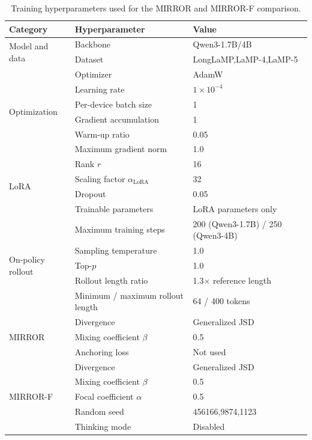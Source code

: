 \documentclass{article} %
\begin{document}
\begin{table}[t]
\centering
\small
\caption{Training hyperparameters used for the MIRROR and MIRROR-F comparison.}
\label{tab:training_hyperparameters}
\begin{tabular}{lll}
\toprule
\textbf{Category} & \textbf{Hyperparameter} & \textbf{Value} \\
\midrule
\multirow{2}{*}{Model and data}
& Backbone & Qwen3-1.7B/4B \\
& Dataset & LongLaMP,LaMP-4,LaMP-5 \\
\midrule
\multirow{6}{*}{Optimization}
& Optimizer & AdamW \\
& Learning rate & $1\times 10^{-4}$ \\
& Per-device batch size & 1 \\
& Gradient accumulation & 1 \\
& Warm-up ratio & 0.05 \\
& Maximum gradient norm & 1.0 \\
\midrule
\multirow{4}{*}{LoRA}
& Rank $r$ & 16 \\
& Scaling factor $\alpha_{\mathrm{LoRA}}$ & 32 \\
& Dropout & 0.05 \\
& Trainable parameters & LoRA parameters only \\
\midrule
\multirow{5}{*}{On-policy rollout}
& Maximum training steps & 200 (Qwen3-1.7B) / 250 (Qwen3-4B) \\
& Sampling temperature & 1.0 \\
& Top-$p$ & 1.0 \\
& Rollout length ratio & 1.3$\times$ reference length \\
& Minimum / maximum rollout length & 64 / 400 tokens \\
\midrule
\multirow{3}{*}{MIRROR}
& Divergence & Generalized JSD \\
& Mixing coefficient $\beta$ & 0.5 \\
& Anchoring loss & Not used \\
\midrule
\multirow{5}{*}{MIRROR-F}
& Divergence & Generalized JSD \\
& Mixing coefficient $\beta$ & 0.5 \\
& Focal coefficient $\alpha$ & 0.5 \\
\midrule
\multirow{2}{*}{Reproducibility}
& Random seed & 456166,9874,1123 \\
& Thinking mode & Disabled \\
\bottomrule
\end{tabular}
\end{table}
\end{document}
